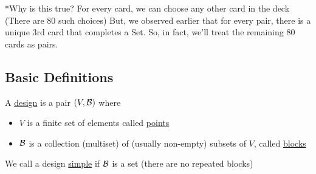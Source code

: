 *Why is this true? For every card, we can choose any other card in the deck (There are 80 such choices)
But, we observed earlier that for every pair, there is a unique 3rd card that completes a Set.
So, in fact, we'll treat the remaining 80 cards as pairs.

\subsection{Basic Definitions}
\begin{definition}[Design]
    A \ul{design} is a pair $(V, \mathcal{B})$ where
    \begin{itemize}
        \item $V$ is a finite set of elements called \ul{points}
        \item $\mathcal{B}$ is a collection (multiset) of (usually non-empty) subsets of $V$, called \ul{blocks}
    \end{itemize}
\end{definition}

We call a design \ul{simple} if $\mathcal{B}$ is a set (there are no repeated blocks)


